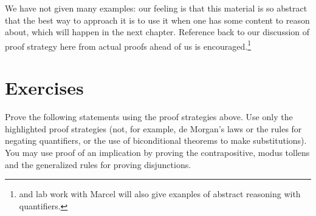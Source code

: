 \documentclass[12pt]{book}
\begin{document}
We have not given many examples: our feeling is that this material is so
abstract that the best way to approach it is to use it when one has
some content to reason about, which will happen in the next chapter.
Reference back to our discussion of proof strategy here from actual
proofs ahead of us is encouraged.\footnote{and lab work with Marcel will also give exanples of abstract reasoning with quantifiers.}


\newpage

\section{Exercises}

Prove the following statements using the proof strategies above.  Use
only the highlighted proof strategies (not, for example, de Morgan's
laws or the rules for negating quantifiers, or the use of biconditional theorems to make substitutions).  You may use proof of an
implication by proving the contrapositive, modus tollens and the
generalized rules for proving disjunctions.
\end{document}
